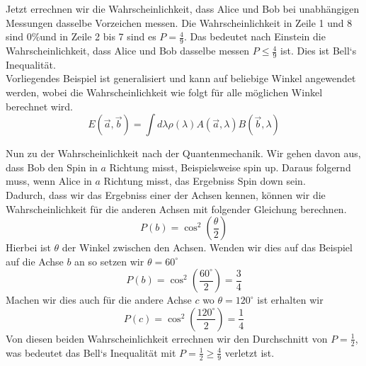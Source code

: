 Jetzt errechnen wir die Wahrscheinlichkeit, dass Alice und Bob bei unabhängigen Messungen dasselbe Vorzeichen messen. Die Wahrscheinlichkeit in Zeile 1 und 8 sind $0\%$und in Zeile 2 bis 7 sind es $P = \frac{4}{9}$.
Das bedeutet nach Einstein die Wahrscheinlichkeit, dass Alice und Bob dasselbe messen $P \leq \frac{4}{9}$ ist. Dies ist Bell`s Inequalität.\\
Vorliegendes Beispiel ist generalisiert und kann auf beliebige Winkel angewendet werden, wobei die Wahrscheinlichkeit wie folgt für alle möglichen Winkel berechnet wird.
\begin{equation}
    E(\overrightarrow{a}, \overrightarrow{b}) = \int d\lambda \rho(\lambda) A(\overrightarrow{a}, \lambda) B(\overrightarrow{b}, \lambda)
\end{equation}

Nun zu der Wahrscheinlichkeit nach der Quantenmechanik. Wir gehen davon aus, dass Bob den Spin in $a$ Richtung misst, Beispielsweise spin up. Daraus folgernd muss, wenn Alice in $a$ Richtung misst, das Ergebniss Spin down sein.\\
Dadurch, dass wir das Ergebniss einer der Achsen kennen, können wir die Wahrscheinlichkeit für die anderen Achsen mit folgender Gleichung berechnen.
\begin{equation}
    P(b) = \cos^2(\frac{\theta}{2})
\end{equation}
Hierbei ist $\theta$ der Winkel zwischen den Achsen. Wenden wir dies auf das Beispiel auf die Achse $b$ an so setzen wir $\theta = 60^\circ$
\begin{equation}
    P(b) = \cos^2(\frac{60^\circ}{2}) = \frac{3}{4}
\end{equation}
Machen wir dies auch für die andere Achse $c$ wo $\theta = 120^\circ$ ist erhalten wir
\begin{equation}
    P(c) = \cos^2(\frac{120^\circ}{2}) = \frac{1}{4}
\end{equation}
Von diesen beiden Wahrscheinlichkeit errechnen wir den Durchschnitt von $P = \frac{1}{2}$, was bedeutet das Bell`s Inequalität mit $P = \frac{1}{2} \ge \frac{4}{9}$ verletzt ist.\\

